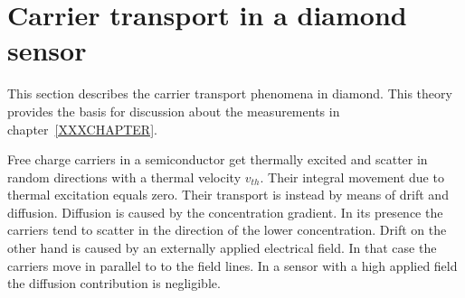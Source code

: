 \documentclass[11pt]{mytustyle}  %
\begin{document}
\section{Carrier transport in a diamond sensor} %
This section describes the carrier transport phenomena in diamond. This theory provides the basis for discussion about the measurements in chapter~\ref{XXXCHAPTER}. 

Free charge carriers in a semiconductor get thermally excited and scatter in random directions with a thermal velocity $v_{th}$. Their integral movement due to thermal excitation equals zero. Their transport is instead by means of drift and diffusion. Diffusion is caused by the concentration gradient. In its presence the carriers tend to scatter in the direction of the lower concentration. Drift on the other hand is caused by an externally applied electrical field. In that case the carriers move in parallel to to the field lines. In a sensor with a high applied field the diffusion contribution is negligible. 
\end{document}
